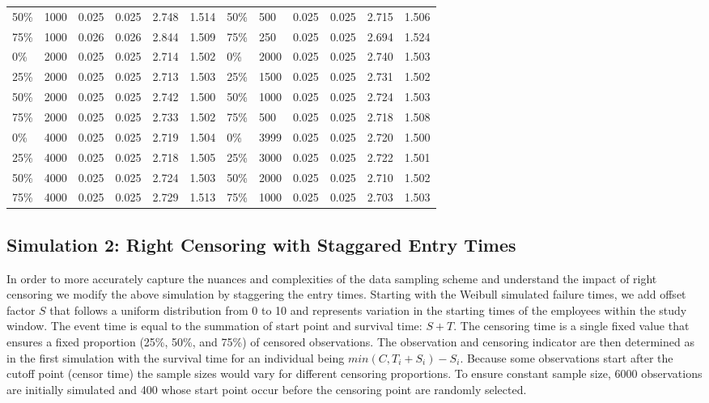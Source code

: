 \documentclass[12pt,letterpaper]{article}
\begin{document}
\begin{table}[!htbp]
\begin{tabular}{@{}C{1.8cm}lllll||C{1.8cm}lllll@{}}
 		50\% & 1000   & 0.025  & 0.025 & 2.748 & 1.514 & 50\%  & 500  & 0.025 & 0.025 & 2.715 & 1.506 \\
 		75\% & 1000   & 0.026  & 0.026 & 2.844 & 1.509 & 75\%  & 250  & 0.025 & 0.025 & 2.694 & 1.524 \\
 		0\%  & 2000   & 0.025  & 0.025 & 2.714 & 1.502 & 0\%   & 2000 & 0.025 & 0.025 & 2.740 & 1.503 \\
 		25\% & 2000   & 0.025  & 0.025 & 2.713 & 1.503 & 25\%  & 1500 & 0.025 & 0.025 & 2.731 & 1.502 \\
 		50\% & 2000   & 0.025  & 0.025 & 2.742 & 1.500 & 50\%  & 1000 & 0.025 & 0.025 & 2.724 & 1.503 \\
 		75\% & 2000   & 0.025  & 0.025 & 2.733 & 1.502 & 75\%  & 500  & 0.025 & 0.025 & 2.718 & 1.508 \\
 		0\%  & 4000   & 0.025  & 0.025 & 2.719 & 1.504 & 0\%   & 3999 & 0.025 & 0.025 & 2.720 & 1.500 \\
 		25\% & 4000   & 0.025  & 0.025 & 2.718 & 1.505 & 25\%  & 3000 & 0.025 & 0.025 & 2.722 & 1.501 \\
 		50\% & 4000   & 0.025  & 0.025 & 2.724 & 1.503 & 50\%  & 2000 & 0.025 & 0.025 & 2.710 & 1.502 \\
 		75\% & 4000  & 0.025 & 0.025  & 2.729 & 1.513 & 75\%  & 1000  & 0.025  & 0.025 & 2.703 & 1.503 \\ \bottomrule
 	\end{tabular}
 	\label{tab:rightcensor}%
 \end{table}



\subsection{Simulation 2: Right Censoring with Staggared Entry Times} \label{rightcensor:sim2}

In order to more accurately capture the nuances and complexities of the data sampling scheme and understand the impact of right censoring we modify the above simulation by staggering the entry times.  Starting with the Weibull simulated failure times, we add offset factor $S$ that follows a uniform distribution from 0 to 10 and represents variation in the starting times of the employees within the study window. The event time is equal to the summation of start point and survival time: $S+T$. The censoring time is a single fixed value that ensures a fixed proportion (25\%, 50\%, and 75\%) of censored observations.  The observation and censoring indicator are then determined as in the first simulation with the survival time for an individual being $min(C,T_i+S_i) - S_i$. Because some observations start after the cutoff point (censor time) the sample sizes would vary for different censoring proportions.  To ensure constant sample size, 6000 observations are initially simulated and 400 whose start point occur before the censoring point are randomly selected.
\end{document}
